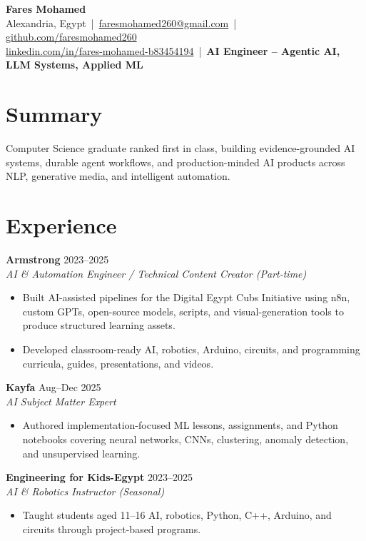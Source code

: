 \documentclass[letterpaper]{article}
\newcommand{\roleline}[3]{\textbf{#1} \hfill #2 \\\textit{#3} \\}
\begin{document}
\footnotesize
\begin{center}
{\LARGE \textbf{Fares Mohamed}}\\[3pt]
Alexandria, Egypt \,|\, \href{mailto:faresmohamed260@gmail.com}{faresmohamed260@gmail.com} \,|\, \href{https://github.com/faresmohamed260}{github.com/faresmohamed260}\\
\href{https://www.linkedin.com/in/fares-mohamed-b83454194/}{linkedin.com/in/fares-mohamed-b83454194} \,|\, \textbf{AI Engineer -- Agentic AI, LLM Systems, Applied ML}
\end{center}

\section*{Summary}
Computer Science graduate ranked first in class, building evidence-grounded AI systems, durable agent workflows, and production-minded AI products across NLP, generative media, and intelligent automation.

\section*{Experience}
\roleline{Armstrong}{2023--2025}{AI \& Automation Engineer / Technical Content Creator (Part-time)}
\begin{itemize}
\item Built AI-assisted pipelines for the Digital Egypt Cubs Initiative using n8n, custom GPTs, open-source models, scripts, and visual-generation tools to produce structured learning assets.
\item Developed classroom-ready AI, robotics, Arduino, circuits, and programming curricula, guides, presentations, and videos.
\end{itemize}
\roleline{Kayfa}{Aug--Dec 2025}{AI Subject Matter Expert}
\begin{itemize}
\item Authored implementation-focused ML lessons, assignments, and Python notebooks covering neural networks, CNNs, clustering, anomaly detection, and unsupervised learning.
\end{itemize}
\roleline{Engineering for Kids-Egypt}{2023--2025}{AI \& Robotics Instructor (Seasonal)}
\begin{itemize}
\item Taught students aged 11--16 AI, robotics, Python, C++, Arduino, and circuits through project-based programs.
\end{itemize}
\end{document}
